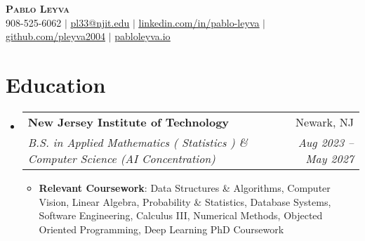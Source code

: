 \documentclass[letterpaper,10pt]{article}
\makeatletter
\newcommand{\resumeSubheading}[4]{
  \vspace{-3pt}\item
    \begin{tabular*}{0.97\textwidth}[t]{l@{\extracolsep{\fill}}r}
      \textbf{#1} & #2 \\
      \textit{\small#3} & \textit{\small #4} \\
    \end{tabular*}\vspace{-9pt}
}
\newcommand{\resumeSubHeadingListStart}{\begin{itemize}[leftmargin=0.15in, label={}]}
\newcommand{\resumeSubHeadingListEnd}{\end{itemize}}
\makeatother
\begin{document}

\begin{center}
    \textbf{\Huge \scshape Pablo Leyva} \\ \vspace{1pt}
    \small 908-525-6062 $|$ \href{mailto:x@x.com}{\underline{pl33@njit.edu}} $|$ 
    \href{https://linkedin.com/in/pablo-leyva}{\underline{linkedin.com/in/pablo-leyva}} $|$
    \href{https://github.com/pleyva2004}{\underline{github.com/pleyva2004}} $|$ 
    \href{pabloleyva.io}{\underline{pabloleyva.io}}
\end{center}
\vspace{-12pt}

\section{Education}
\vspace{5pt}
  \resumeSubHeadingListStart
    \resumeSubheading
      {New Jersey Institute of Technology}{Newark, NJ}
      {B.S. in Applied Mathematics ( Statistics ) \& Computer Science (AI Concentration) }{Aug 2023 -- May 2027}
        \vspace{5pt}
        \begin{itemize}[leftmargin=0.15in, itemsep=3in, label={}]
            \small\item{
                \textbf{Relevant Coursework}: Data Structures \& Algorithms, Computer Vision, Linear Algebra, Probability \& Statistics, Database Systems, Software Engineering, Calculus III, Numerical Methods, Objected Oriented Programming, Deep Learning PhD Coursework}
         \end{itemize}
        
          \resumeSubHeadingListEnd
\vspace{-10pt}
\end{document}

